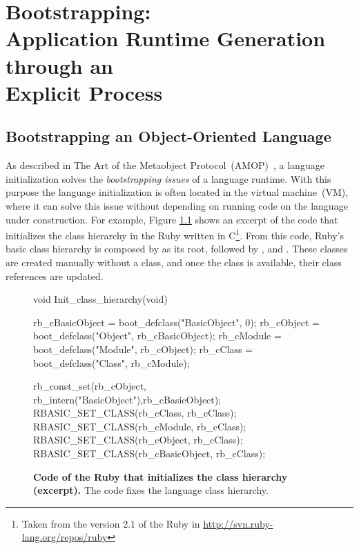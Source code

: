 
\part{Bootstrapping:\\Application Runtime Generation\\through an\\Explicit Process}
\chapter{Bootstrapping an Object-Oriented Language}
\introduction

As described in The Art of the Metaobject Protocol~(AMOP)~\cite{Kicz91a}, a language initialization solves the \emph{bootstrapping issues} of a language runtime. With this purpose the language initialization is often located in the virtual machine~(VM), where it can solve this issue without depending on running code on the language under construction. For example, Figure \ref{code:ruby_hierarchy} shows an excerpt of the code that initializes the class hierarchy in the Ruby \VM written in C\footnote{Taken from the version 2.1 of the Ruby \VM in \url{http://svn.ruby-lang.org/repos/ruby}}. From this code, Ruby's basic class hierarchy is composed by  as its root, followed by ,  and . These classes are created manually without a class, and once the class  is available, their class references are updated.

\begin{figure}[ht!]
\begin{code}
void Init_class_hierarchy(void) {
    rb_cBasicObject = boot_defclass("BasicObject", 0);
    rb_cObject = boot_defclass("Object", rb_cBasicObject);
    rb_cModule = boot_defclass("Module", rb_cObject);
    rb_cClass =  boot_defclass("Class",  rb_cModule);

    rb_const_set(rb_cObject, rb_intern("BasicObject"),rb_cBasicObject);
    RBASIC_SET_CLASS(rb_cClass, rb_cClass);
    RBASIC_SET_CLASS(rb_cModule, rb_cClass);
    RBASIC_SET_CLASS(rb_cObject, rb_cClass);
    RBASIC_SET_CLASS(rb_cBasicObject, rb_cClass);
}
\end{code}
\caption{\textbf{Code of the Ruby \VM that initializes the class hierarchy (excerpt).} The \VM code fixes the language class hierarchy.\label{code:ruby_hierarchy}}
\end{figure}


